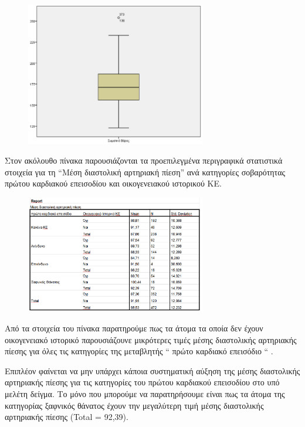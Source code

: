     \begin{figure}
        \centering
        \includegraphics[width=0.7\textwidth]{images/21.png}
    \end{figure}
    
\clearpage
Στον ακόλουθο πίνακα παρουσιάζονται τα προεπιλεγμένα περιγραφικά στατιστικά στοιχεία για τη “Μέση διαστολική αρτηριακή πίεση” ανά κατηγορίες σοβαρότητας πρώτου καρδιακού επεισοδίου και οικογενειακού ιστορικού ΚΕ.
\begin{figure}[hb]
        \centering
        \includegraphics[width=0.7\textwidth]{images/22.PNG}
    \end{figure}
    
    Από τα στοιχεία του πίνακα παρατηρούμε πως τα άτομα τα οποία δεν έχουν οικογενειακό ιστορικό παρουσιάζουνε μικρότερες τιμές μέσης διαστολικής αρτηριακής πίεσης για όλες τις κατηγορίες της μεταβλητής “ πρώτο καρδιακό επεισόδιο “ . 
    
Επιπλέον φαίνεται να μην υπάρχει κάποια συστηματική αύξηση της μέσης διαστολικής αρτηριακής πίεσης για τις κατηγορίες του πρώτου καρδιακού επεισοδίου στο υπό μελέτη δείγμα. Το μόνο που μπορούμε να παρατηρήσουμε είναι πως τα άτομα της κατηγορίας ξαφνικός θάνατος έχουν την μεγαλύτερη τιμή μέσης διαστολικής αρτηριακής πίεσης (Total = 92,39). 

